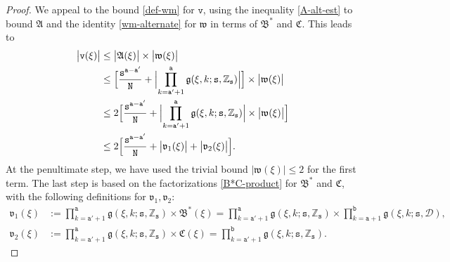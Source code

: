 \documentclass[12pt, twoside]{article}
\theoremstyle{definition}
\numberwithin{equation}{section}
\begin{document}
\begin{proof} 
We appeal to the bound \eqref{def-wm} for $\mathtt v$, using the inequality \eqref{A-alt-est} to bound $\mathfrak A$ and the identity \eqref{wm-alternate} for $\mathfrak w$ in terms of $\mathfrak B^{\ast}$ and $\mathfrak C$.  This leads to  
\begin{align} 
\bigl| \mathtt v(\xi) \bigr| &\leq \bigl| \mathfrak A(\xi) \bigr| \times \bigl| \mathfrak w(\xi) \bigr| \nonumber \\ 
&\leq \Bigl[ \frac{\mathtt s^{\mathtt a - \mathtt a'}}{\mathtt N} + \Bigl| \prod_{k = \mathtt a'+1}^{\mathtt a} \mathfrak g(\xi, k; \mathtt s, \mathbb Z_{\mathtt s}) \Bigr|\Bigr] \times \bigl| \mathfrak w(\xi) \bigr| \nonumber \\ 
&\leq  2 \Bigl[ \frac{\mathtt s^{\mathtt a - \mathtt a'}}{\mathtt N} +   \Bigl| \prod_{k = \mathtt a'+1}^{\mathtt a} \mathfrak g(\xi, k; \mathtt s, \mathbb Z_{\mathtt s}) \Bigr| \times \bigl| \mathfrak w(\xi) \bigr| \Bigr] \nonumber \\ 
&\leq 2 \Bigl[ \frac{\mathtt s^{\mathtt a - \mathtt a'}}{\mathtt N} + \bigl| {\mathfrak v}_1(\xi) \bigr|  + \bigl| {\mathfrak v}_2(\xi) \bigr|  \Bigr]. \label{v-v1-v2}
\end{align} 
At the penultimate step, we have used the trivial bound $|\mathfrak w(\xi)| \leq 2$ for the first term. The last step is based on the factorizations \eqref{B*C-product} for $\mathfrak B^{\ast}$ and $\mathfrak C$, with the following definitions for $\mathfrak v_1, \mathfrak v_2$:  
\begin{align} 
\mathfrak v_1(\xi) &:=  \prod_{k = \mathtt a'+1}^{\mathtt a} \mathfrak g(\xi, k; \mathtt s,  \mathbb Z_{\mathtt s}) \times \mathfrak B^{\ast}(\xi) = \prod_{k = \mathtt a'+1}^{\mathtt a} \mathfrak g(\xi, k; \mathtt s, \mathbb Z_{\mathtt s}) \times \prod_{k=\mathtt a+1}^{\mathtt b} \mathfrak g(\xi, k; \mathtt s, \mathscr{D}), \label{v1-formula}  \\ 
\mathfrak v_2(\xi) &:=  \prod_{k = \mathtt a'+1}^{\mathtt a} \mathfrak g(\xi, k; \mathtt s, \mathbb Z_{\mathtt s}) \times \mathfrak C(\xi) =   \prod_{k = \mathtt a'+1}^{\mathtt b} \mathfrak g(\xi, k; \mathtt s, \mathbb Z_{\mathtt s}).  \label{v2-formula} 

\end{align}
\end{proof}
\end{document}
